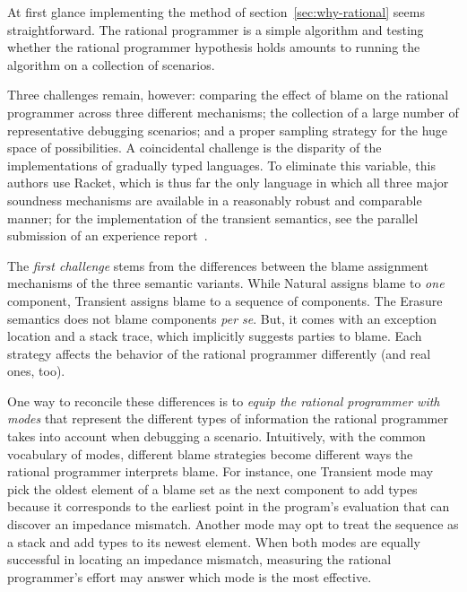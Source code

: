 
At first glance implementing the method of section~\ref{sec:why-rational}
seems straightforward. The rational programmer is a simple algorithm and testing
whether the rational programmer hypothesis holds amounts to running the
algorithm on a collection of scenarios.

Three challenges remain, however: comparing the effect of blame on the rational
programmer across three different mechanisms; the collection of a large number
of representative debugging scenarios; and a proper sampling strategy for the
huge space of possibilities. A coincidental challenge is the disparity of the
implementations of gradually typed languages. To eliminate this variable, this
authors use Racket, which is thus far the only language in which all three major
soundness mechanisms are available in a reasonably robust and comparable manner;
for the implementation of the transient semantics, see the parallel submission
of an experience report~\cite{ttt21}.

The {\em first challenge\/} stems from the differences between the blame
assignment mechanisms of the three semantic variants.  While Natural assigns
blame to {\em one\/} component, Transient assigns blame to a sequence of
components. The Erasure semantics does not blame components {\it per se\/}. But,
it comes with an exception location and a stack trace, which implicitly suggests
parties to blame.  Each strategy affects the behavior of the rational programmer
differently (and real ones, too).

One way to reconcile these differences is to {\em equip the rational
programmer with modes \/} that represent the different types of
information the rational programmer takes into account when debugging a
scenario. Intuitively, with the common vocabulary of modes, different
blame strategies become different ways the rational programmer  interprets
blame.  For instance, one Transient mode may pick the oldest element of a
blame set as the next component to add types because it corresponds to the
earliest point in the program's evaluation that can discover an impedance
mismatch.  Another mode may opt to treat the sequence as a stack and add
types to its newest element.  When both modes are equally successful in
locating an impedance mismatch, measuring the rational programmer's effort
may answer which mode is the most effective.


